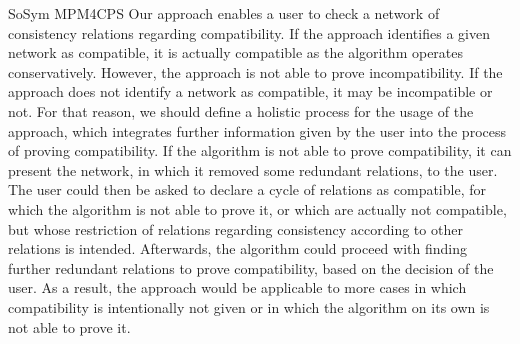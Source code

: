 \begin{copiedFrom}{SoSym MPM4CPS}
Our approach enables a user to check a network of consistency relations regarding compatibility.
If the approach identifies a given network as compatible, it is actually compatible as the algorithm operates conservatively.
However, the approach is not able to prove incompatibility. If the approach does not identify a network as compatible, it may be incompatible or not.
For that reason, we should define a holistic process for the usage of the approach, which integrates further information given by the user into the process of proving compatibility.
If the algorithm is not able to prove compatibility, it can present the network, in which it removed some redundant relations, to the user.
The user could then be asked to declare a cycle of relations as compatible, for which the algorithm is not able to prove it, or which are actually not compatible, but whose restriction of relations regarding consistency according to other relations is intended.
Afterwards, the algorithm could proceed with finding further redundant relations to prove compatibility, based on the decision of the user.
As a result, the approach would be applicable to more cases in which compatibility is intentionally not given or in which the algorithm on its own is not able to prove it.



\end{copiedFrom}
